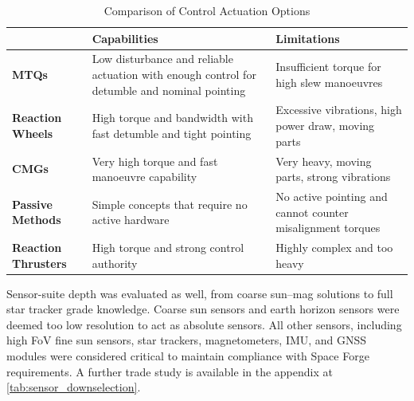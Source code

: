 \documentclass[a4paper, 11pt, conference]{IEEEtran}
\begin{document}
\begin{table}[H]
\centering
\caption{Comparison of Control Actuation Options}
\begin{tabular}{p{3cm} p{7cm} p{7cm}}
\hline
 & \textbf{Capabilities} 
 & \textbf{Limitations} \\
\hline

\cellcolor{yellow!25}\textbf{MTQs} 
 & \cellcolor{yellow!25}Low disturbance and reliable actuation with enough control for detumble and nominal pointing 
 & \cellcolor{yellow!25}Insufficient torque for high slew manoeuvres \\ 
\hline

\cellcolor{yellow!25}\textbf{Reaction Wheels} 
 & \cellcolor{yellow!25}High torque and bandwidth with fast detumble and tight pointing 
 & \cellcolor{yellow!25}Excessive vibrations, high power draw, moving parts \\ 
\hline

\textbf{CMGs} 
 & Very high torque and fast manoeuvre capability 
 & Very heavy, moving parts, strong vibrations \\ 
\hline

\textbf{Passive Methods} 
 & Simple concepts that require no active hardware 
 & No active pointing and cannot counter misalignment torques \\ 
\hline

\textbf{Reaction Thrusters} 
 & High torque and strong control authority 
 & Highly complex and too heavy \\ 
\hline

\end{tabular}
\label{tab:actuators}
\end{table}

Sensor-suite depth was evaluated as well, from coarse sun–mag solutions to full star tracker grade knowledge. Coarse sun sensors and earth horizon sensors were deemed too low resolution to act as absolute sensors. All other sensors, including high FoV fine sun sensors, star trackers, magnetometers, IMU, and GNSS modules were considered critical to maintain compliance with Space Forge requirements. A further trade study is available in the appendix at \autoref{tab:sensor_downselection}.
\end{document}

